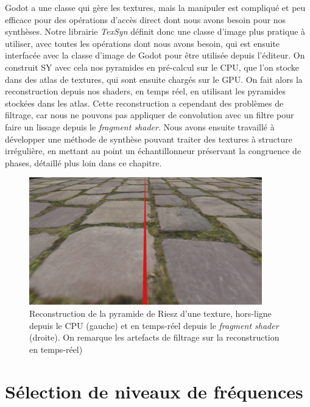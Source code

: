 \bigskip

Godot a une classe qui gère les textures, mais la manipuler est compliqué et peu efficace pour des opérations d'accès direct dont nous avons besoin pour nos synthèses. Notre librairie \textit{TexSyn} définit donc une classe d'image plus pratique à utiliser, avec toutes les opérations dont nous avons besoin, qui est ensuite interfacée avec la classe d'image de Godot pour être utilisée depuis l'éditeur. On construit SY avec cela nos pyramides en pré-calcul sur le CPU, que l'on stocke dans des atlas de textures, qui sont ensuite chargés sur le GPU. On fait alors la reconstruction depuis nos shaders, en temps réel, en utilisant les pyramides stockées dans les atlas. Cette reconstruction a cependant des problèmes de filtrage, car nous ne pouvons pas appliquer de convolution avec un filtre pour faire un lissage depuis le \textit{fragment shader}. Nous avons ensuite travaillé à développer une méthode de synthèse pouvant traiter des textures à structure irrégulière, en mettant au point un échantillonneur préservant la congruence de phases, détaillé plus loin dans ce chapitre.

\begin{figure}
    \centering
    \includegraphics[width=0.9\textwidth]{contenu/resources/images/reconstruction_cpu_vs_gpu}
    \caption[Reconstruction de texture dans \textit{TexSyn}]{Reconstruction de la pyramide de Riesz d'une texture, hors-ligne depuis le CPU (gauche) et en temps-réel depuis le \textit{fragment shader} (droite). On remarque les artefacts de filtrage sur la reconstruction en temps-réel)}
    \label{fig:texsyn-reconstruction}
\end{figure}


\section{Sélection de niveaux de fréquences}

